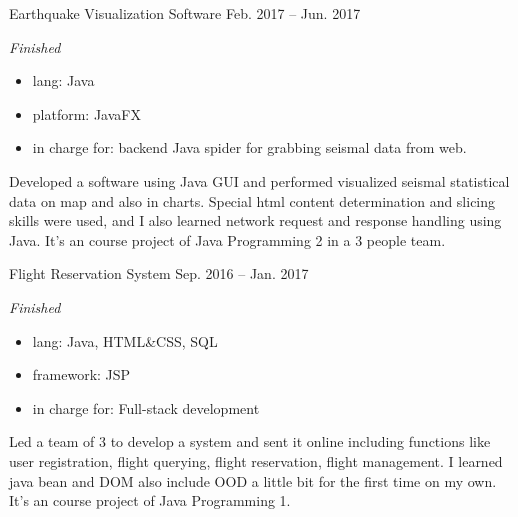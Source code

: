 \documentclass[hidelinks__VERSION__]{adamyi-cv}
\begin{document}
\begin{entrylist}

\entry
{Earthquake Visualization Software}
{Feb. 2017 -- Jun. 2017}
{\emph{Finished}
\begin{itemize}
    \item lang: Java
    \item platform: JavaFX
    \item in charge for: backend Java spider for grabbing seismal data from web.
\end{itemize}
Developed a software using Java GUI and performed visualized seismal statistical data on map and also in charts. Special html content determination and slicing skills were used, and I also learned network request and response handling using Java. It's an course project of Java Programming 2 in a 3 people team.
}


\entry
{Flight Reservation System}
{Sep. 2016 -- Jan. 2017}
{\emph{Finished}
\begin{itemize}
    \item lang: Java, HTML\&CSS, SQL
    \item framework: JSP
    \item in charge for: Full-stack development
\end{itemize}
Led a team of 3 to develop a system and sent it online including functions like user registration, flight querying, flight reservation, flight management. I learned java bean and DOM also include OOD a little bit for the first time on my own. It's an course project of Java Programming 1.
}


\end{entrylist}
\end{document}
